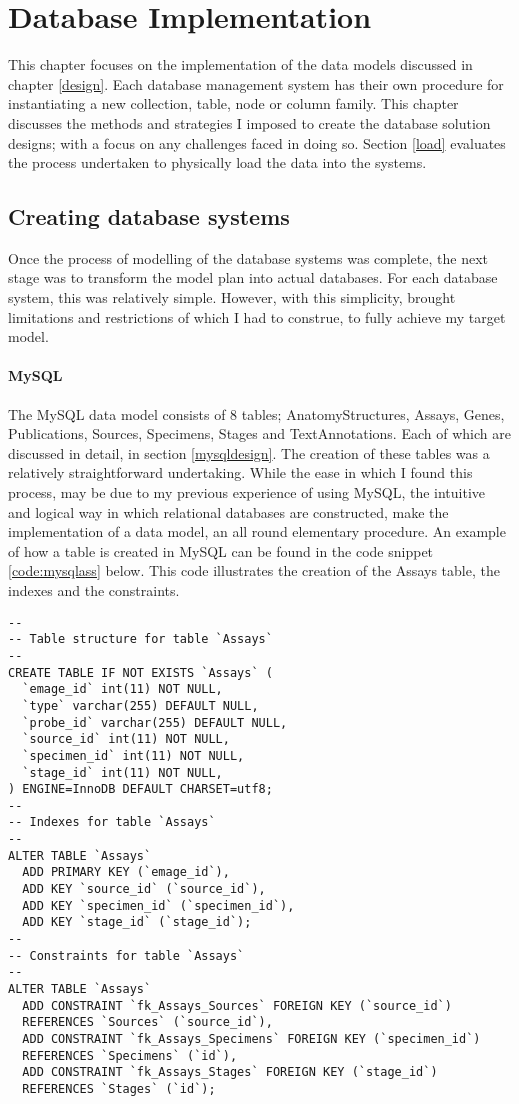 \chapter{Database Implementation}\label{implementation}
This chapter focuses on the implementation of the data models discussed in chapter \ref{design}. Each database management system has their own procedure for instantiating a new collection, table, node or column family. This chapter discusses the methods and strategies I imposed to create the database solution designs; with a focus on any challenges faced in doing so. Section \ref{load} evaluates the process undertaken to physically load the data into the systems.

\section{Creating database systems}\label{dbcreate}
Once the process of modelling of the database systems was complete, the next stage was to transform the model plan into actual databases. For each database system, this was relatively simple. However, with this simplicity, brought limitations and restrictions of which I had to construe, to fully achieve my target model.

\subsubsection*{MySQL}
The MySQL data model consists of 8 tables; AnatomyStructures, Assays, Genes, Publications, Sources, Specimens, Stages and TextAnnotations. Each of which are discussed in detail, in section \ref{mysqldesign}. The creation of these tables was a relatively straightforward undertaking. While the ease in which I found this process, may be due to my previous experience of using MySQL, the intuitive and logical way in which relational databases are constructed, make the implementation of a data model, an all round elementary procedure. An example of how a table is created in MySQL can be found in the code snippet \ref{code:mysqlass} below. This code illustrates the creation of the Assays table, the indexes and the constraints.
\newpage
\begin{lstlisting}[caption=Creation of Assays table, label=code:mysqlass]
--
-- Table structure for table `Assays`
--
CREATE TABLE IF NOT EXISTS `Assays` (
  `emage_id` int(11) NOT NULL,
  `type` varchar(255) DEFAULT NULL,
  `probe_id` varchar(255) DEFAULT NULL,
  `source_id` int(11) NOT NULL,
  `specimen_id` int(11) NOT NULL,
  `stage_id` int(11) NOT NULL,
) ENGINE=InnoDB DEFAULT CHARSET=utf8;
--
-- Indexes for table `Assays`
--
ALTER TABLE `Assays`
  ADD PRIMARY KEY (`emage_id`),
  ADD KEY `source_id` (`source_id`),
  ADD KEY `specimen_id` (`specimen_id`),
  ADD KEY `stage_id` (`stage_id`);
--
-- Constraints for table `Assays`
--
ALTER TABLE `Assays`
  ADD CONSTRAINT `fk_Assays_Sources` FOREIGN KEY (`source_id`)
  REFERENCES `Sources` (`source_id`),
  ADD CONSTRAINT `fk_Assays_Specimens` FOREIGN KEY (`specimen_id`)
  REFERENCES `Specimens` (`id`),
  ADD CONSTRAINT `fk_Assays_Stages` FOREIGN KEY (`stage_id`)
  REFERENCES `Stages` (`id`);
\end{lstlisting}

